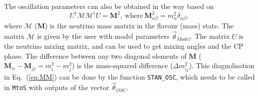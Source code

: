 \documentclass[aps,prd,nofootinbib,preprint]{revtex4}
\begin{document}
The oscillation parameters can also be obtained in the way based on
\begin{equation}\label{eq:MM}
U^\dagger\mathcal{M}\mathcal{M}^\dagger U = \mathbf{M}^2,~\text{where}~\mathbf{M}^2_{\alpha\beta}=m_\alpha^2\delta_{\alpha\beta},
\end{equation}
where $\mathcal{M}$ ($\mathbf{M}$) is the neutrino mass matrix in the flavour (mass) state. The matrix $\mathcal{M}$ is given by the user with model parameters $\vec{\theta}_{Model}$. The matrix $U$ is the neutrino mixing matrix, and can be used to get mixing angles and the CP phase. The difference between any two diagonal elements of $\textbf{M}$ ($\textbf{M}_{ii}-\textbf{M}_{jj}=m_i^2-m_j^2$) is the mass-squared difference ($\Delta m_{ij}^2$). This diagnolisation in Eq.~(\ref{eq:MM}) can be done by the function \texttt{STAN\_OSC}, which needs to be called in \texttt{MtoS} with outputs of the vector $\vec{\theta}_{OSC}$. 
\end{document}
